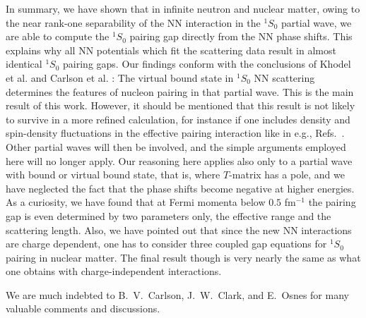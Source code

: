 \begin{multicols}{2}
In summary, we have shown that in infinite neutron and nuclear matter, 
owing to the near rank-one separability of the NN interaction in 
the $^1S_0$ partial wave,  
we are able to compute the $^1S_0$ pairing gap directly from the NN 
phase shifts. This explains why all NN potentials which fit 
the scattering data result in almost identical $^1S_0$ pairing gaps.  
Our findings conform with the conclusions of Khodel et al. \cite{khodel96} 
and Carlson et al. \cite{carlson97}: 
The virtual bound state in $^1S_0$ NN scattering determines  
the features of nucleon pairing in that partial wave.    
This is the main result of this work. 
However, it should be mentioned that this result    
is not likely to survive in a more refined calculation, for instance 
if one includes density and spin-density fluctuations in the 
effective pairing interaction like in e.g., Refs.\ \cite{wam93,schulze96}.  
Other partial waves will then be involved, and the simple arguments 
employed here will no longer apply.  Our reasoning here
applies also only
to a partial wave with bound or virtual bound state, that is, where  
$T$-matrix has a pole, and we have
neglected the fact that the phase shifts become negative at higher
energies.  
As a curiosity, we have found that at Fermi momenta below
$0.5$ fm$^{-1}$ the pairing gap is even determined by two parameters 
only, the effective range and the scattering length.
Also, we have pointed out that since the new NN interactions are charge 
dependent, one has to consider three coupled gap equations for 
$^1S_0$ pairing in nuclear matter.  The final result though is very 
nearly the same as what one obtains with charge-independent interactions.


We are much indebted to  B.\ V.\ Carlson, 
J.\ W.\ Clark, and E.\ Osnes for many 
valuable comments and discussions.  
  

\end{multicols}

